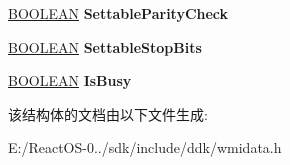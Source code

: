 \begin{DoxyCompactItemize}
\hyperlink{_processor_bind_8h_a112e3146cb38b6ee95e64d85842e380a}{B\+O\+O\+L\+E\+AN} {\bfseries Settable\+Parity\+Check}
\item 
\mbox{\label{struct___s_e_r_i_a_l___w_m_i___c_o_m_m___d_a_t_a_a51aa9c86940249565caf0ee207271985}} 
\hyperlink{_processor_bind_8h_a112e3146cb38b6ee95e64d85842e380a}{B\+O\+O\+L\+E\+AN} {\bfseries Settable\+Stop\+Bits}
\item 
\mbox{\label{struct___s_e_r_i_a_l___w_m_i___c_o_m_m___d_a_t_a_a2c0ede798ad86bef40a3f11f6074b4c0}} 
\hyperlink{_processor_bind_8h_a112e3146cb38b6ee95e64d85842e380a}{B\+O\+O\+L\+E\+AN} {\bfseries Is\+Busy}
\end{DoxyCompactItemize}


该结构体的文档由以下文件生成\+:\begin{DoxyCompactItemize}
\item 
E\+:/\+React\+O\+S-\/0../sdk/include/ddk/wmidata.\+h\end{DoxyCompactItemize}
